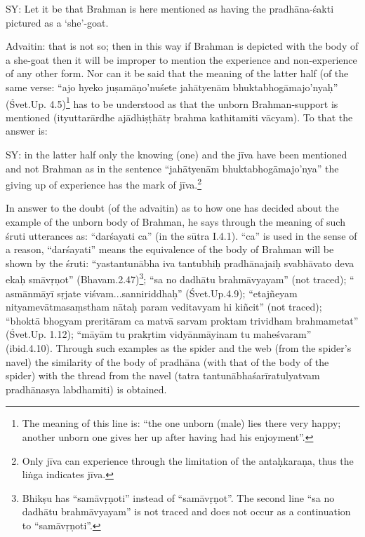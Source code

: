 			



SY: Let it be that Brahman is here mentioned as having the pradhāna-śakti  pictured as a ‘she’-goat.

Advaitin: that is not so; then in this way if Brahman is depicted with the body of a she-goat then it will be improper to mention the experience and non-experience of any other form.  Nor can it be said that the meaning of the latter half (of the same verse: “ajo hyeko juṣamāṇo’nuśete jahātyenām bhuktabhogāmajo’nyaḥ” (Śvet.Up. 4.5)\footnote{The meaning of this line is: “the one unborn (male) lies there very happy; another unborn one gives her up after  having had his enjoyment”.} has to be understood as that the unborn Brahman-support is mentioned (ityuttarārdhe ajādhiṣṭhātṛ brahma kathitamiti vācyam). To that the answer is:

SY: in the latter half only the knowing (one) and the jīva have been mentioned and not Brahman as in the sentence “jahātyenām bhuktabhogāmajo’nya” the giving up of experience has the mark of jīva.\footnote{Only jīva can experience through the limitation of the antaḥkaraṇa, thus the liṅga indicates jīva.}

In answer to the doubt (of the advaitin) as to how one has decided about the example of the unborn body of Brahman, he says through the meaning of such śruti utterances as:  “darśayati ca” (in the sūtra I.4.1). “ca” is used in the sense of a reason, “darśayati” means the equivalence of the body of Brahman will be shown by the śruti: “yastantunābha iva tantubhiḥ pradhānajaiḥ svabhāvato deva ekaḥ smāvṛṇot” (Bhavam.2.47)\footnote{Bhikṣu has “samāvṛṇoti” instead of “samāvṛṇot”. The second line “sa no dadhātu brahmāvyayam” is not traced and does not occur as a continuation to “samāvṛṇoti”.}; “sa no dadhātu brahmāvyayam” (not traced); “ asmānmāyī sṛjate viśvam...sanniriddhaḥ” (Śvet.Up.4.9); “etajñeyam nityamevātmasaṃstham nātaḥ param veditavyam hi kiñcit” (not traced); “bhoktā bhogyam preritāram ca matvā sarvam proktam trividham brahmametat” (Śvet.Up. 1.12); “māyām tu prakṛtim vidyānmāyinam tu maheśvaram” (ibid.4.10).  Through such examples as the spider and the web (from the spider’s navel) the similarity of the body of pradhāna (with that of the body of the spider) with the thread from the navel (tatra tantunābhaśarīratulyatvam pradhānasya labdhamiti) is obtained.

